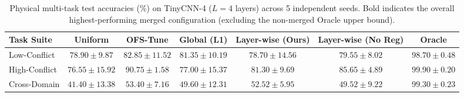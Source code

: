 \begin{table}[t]
\caption{Physical multi-task test accuracies (\%) on TinyCNN-4 ($L=4$ layers) across 5 independent seeds. Bold indicates the overall highest-performing merged configuration (excluding the non-merged Oracle upper bound).}
\label{tab:tiny_cnn_results}
\vskip 0.04in
\begin{center}
\begin{small}
\begin{sc}
\setlength{\tabcolsep}{4pt}
\begin{tabular}{lcccccc}
\toprule
Task Suite & Uniform & OFS-Tune & Global (L1) & Layer-wise (Ours) & Layer-wise (No Reg) & Oracle \\
\midrule
Low-Conflict   & $78.90 \pm 9.87$ & $\mathbf{82.85 \pm 11.52}$ & $81.35 \pm 10.19$ & $78.70 \pm 14.56$ & $79.55 \pm 8.02$ & $98.70 \pm 0.48$ \\
High-Conflict  & $76.55 \pm 15.92$ & $\mathbf{90.75 \pm 1.58}$ & $77.00 \pm 15.37$ & $81.30 \pm 9.69$ & $85.65 \pm 4.89$ & $99.90 \pm 0.20$ \\
Cross-Domain   & $41.40 \pm 13.38$ & $\mathbf{53.40 \pm 7.16}$ & $49.60 \pm 12.31$ & $52.52 \pm 5.95$ & $49.52 \pm 9.22$ & $99.30 \pm 0.23$ \\
\bottomrule
\end{tabular}
\end{sc}
\end{small}
\end{center}
\vskip -0.18in
\end{table}


